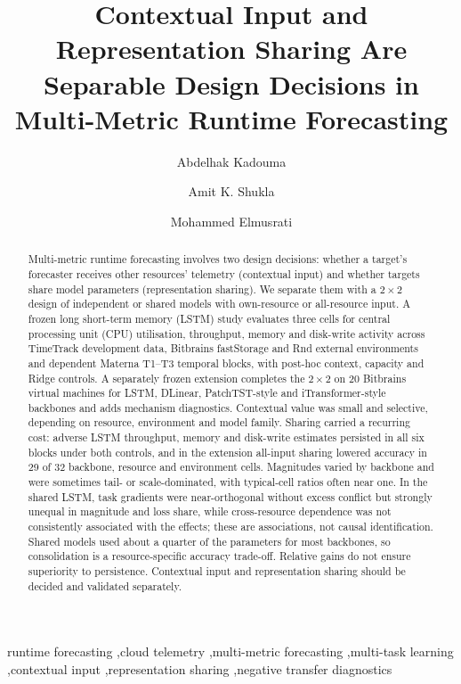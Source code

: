 \documentclass[5p,twocolumn]{elsarticle}
\begin{document}
\begin{frontmatter}

\title{Contextual Input and Representation Sharing Are Separable Design Decisions in Multi-Metric Runtime Forecasting}

\author[uva]{Abdelhak Kadouma}
\author[uva,sau]{Amit K. Shukla}
\author[uva]{Mohammed Elmusrati}



\begin{abstract}
Multi-metric runtime forecasting involves two design decisions: whether a
target's forecaster receives other resources' telemetry (contextual input)
and whether targets share model parameters (representation sharing). We
separate them with a $2\times2$ design of independent or shared models with
own-resource or all-resource input. A frozen long short-term memory (LSTM)
study evaluates three cells for central processing unit (CPU) utilisation,
throughput, memory and disk-write activity across TimeTrack development
data, Bitbrains fastStorage and Rnd external environments and dependent
Materna T1--T3 temporal blocks, with post-hoc context, capacity and Ridge
controls. A separately frozen extension completes the $2\times2$ on 20
Bitbrains virtual machines for LSTM, DLinear, PatchTST-style and
iTransformer-style backbones and adds mechanism diagnostics. Contextual
value was small and selective, depending on resource, environment and model
family. Sharing carried a recurring cost: adverse LSTM throughput, memory
and disk-write estimates persisted in all six blocks under both controls,
and in the extension all-input sharing lowered accuracy in 29 of 32
backbone, resource and environment cells. Magnitudes varied by backbone and
were sometimes tail- or scale-dominated, with typical-cell ratios often near
one. In the shared LSTM, task gradients were
near-orthogonal without excess conflict but strongly unequal in magnitude
and loss share, while cross-resource dependence was not consistently
associated with the effects;
these are associations, not causal identification. Shared models used
about a quarter of the parameters for most backbones, so consolidation is a
resource-specific accuracy trade-off. Relative gains do not ensure
superiority to persistence. Contextual input and representation sharing
should be decided and validated separately.
\end{abstract}

\begin{keyword}
runtime forecasting \sep cloud telemetry \sep multi-metric forecasting \sep multi-task learning \sep contextual input \sep representation sharing \sep negative transfer diagnostics
\end{keyword}

\end{frontmatter}
\end{document}
